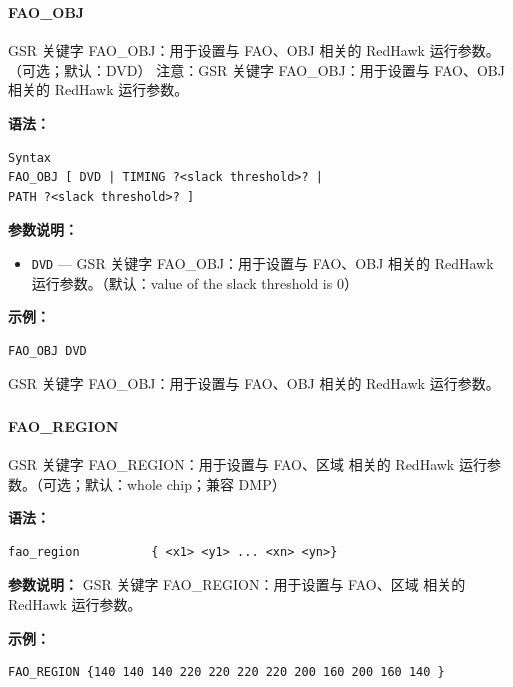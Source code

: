 \subsubsection{}
\paragraph*{FAO_OBJ}

GSR 关键字 FAO_OBJ：用于设置与 FAO、OBJ 相关的 RedHawk 运行参数。（可选；默认：DVD） 注意：GSR 关键字 FAO_OBJ：用于设置与 FAO、OBJ 相关的 RedHawk 运行参数。

\textbf{语法：}
\begin{lstlisting}
Syntax
FAO_OBJ [ DVD | TIMING ?<slack threshold>? |
PATH ?<slack threshold>? ]
\end{lstlisting}

\textbf{参数说明：}
\begin{itemize}
\item \texttt{DVD} — GSR 关键字 FAO\_OBJ：用于设置与 FAO、OBJ 相关的 RedHawk 运行参数。（默认：value of the slack threshold is 0）
\end{itemize}

\textbf{示例：}
\begin{lstlisting}
FAO_OBJ DVD
\end{lstlisting}

\begin{noteBox}
GSR 关键字 FAO\_OBJ：用于设置与 FAO、OBJ 相关的 RedHawk 运行参数。
\end{noteBox}

\subsubsection{}
\paragraph*{FAO_REGION}

GSR 关键字 FAO_REGION：用于设置与 FAO、区域 相关的 RedHawk 运行参数。（可选；默认：whole chip；兼容 DMP）

\textbf{语法：}
\begin{lstlisting}
fao_region          { <x1> <y1> ... <xn> <yn>}
\end{lstlisting}

\textbf{参数说明：}
GSR 关键字 FAO\_REGION：用于设置与 FAO、区域 相关的 RedHawk 运行参数。

\textbf{示例：}
\begin{lstlisting}
FAO_REGION {140 140 140 220 220 220 220 200 160 200 160 140 }
\end{lstlisting}

